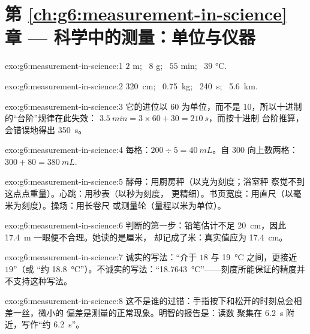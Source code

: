 \section*{第 \ref{ch:g6:measurement-in-science} 章 --- 科学中的测量：单位与仪器}

\begin{solution}{exo:g6:measurement-in-science:1}
$2$ \unit{m}; \ $8$ \unit{g}; \ $55$ \unit{min}; \ $39$
\unit{\celsius}.
\end{solution}

\begin{solution}{exo:g6:measurement-in-science:2}
\qty{320}{cm}; \ \qty{0.75}{kg}; \ \qty{240}{s}; \ \qty{5.6}{km}.
\end{solution}

\begin{solution}{exo:g6:measurement-in-science:3}
它的进位以 $60$ 为单位，而不是 $10$，所以十进制的“台阶”规律在此失效：
$\qty{3.5}{min} = 3 \times 60 + 30 = \qty{210}{s}$，而按十进制
台阶推算，会错误地得出 \qty{350}{s}。
\end{solution}

\begin{solution}{exo:g6:measurement-in-science:4}
每格：$200 \div 5 = \qty{40}{mL}$。自 $300$ 向上数两格：
$300 + 80 = \qty{380}{mL}$.
\end{solution}

\begin{solution}{exo:g6:measurement-in-science:5}
酵母：用厨房秤（以克为刻度；浴室秤
察觉不到这点点重量）。心跳：用秒表（以秒为刻度，
更精细）。书页宽度：用直尺（以毫米为刻度）。操场：用长卷尺
或测量轮（量程以米为单位）。
\end{solution}

\begin{solution}{exo:g6:measurement-in-science:6}
判断的第一步：铅笔估计不足 \qty{20}{cm}，因此
\qty{17.4}{m} 一眼便不合理。她读的是厘米，
却记成了米：真实值应为 \qty{17.4}{cm}。
\end{solution}

\begin{solution}{exo:g6:measurement-in-science:7}
诚实的写法：“介于 $18$ 与 \qty{19}{\celsius} 之间，更接近 $19$”（或
“约 \qty{18.8}{\celsius}”）。不诚实的写法：“\qty{18.7643}
{\celsius}”——刻度所能保证的精度并不支持这种写法。
\end{solution}

\begin{solution}{exo:g6:measurement-in-science:8}
这不是谁的过错：手指按下和松开的时刻总会相差一丝，微小的
偏差是测量的正常现象。明智的报告是：读数
聚集在 \qty{6.2}{s} 附近，写作“约 \qty{6.2}{s}”。
\end{solution}


